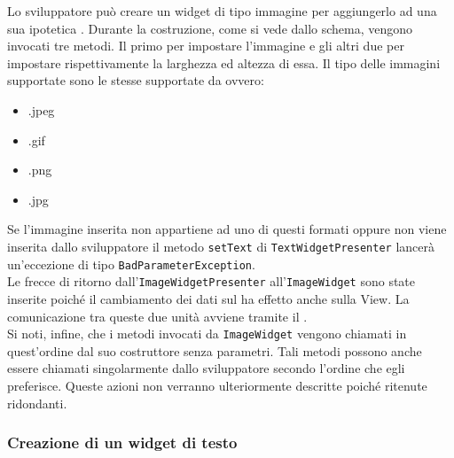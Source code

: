 Lo sviluppatore può creare un widget di tipo immagine per aggiungerlo ad una sua ipotetica . Durante la costruzione, come si vede dallo schema, vengono invocati tre metodi. Il primo per impostare l'immagine e gli altri due per impostare rispettivamente la larghezza ed altezza di essa. Il tipo delle immagini supportate sono le stesse supportate da  ovvero:
\begin{itemize}
\item .jpeg
\item .gif
\item .png
\item .jpg
\end{itemize}
Se l'immagine inserita non appartiene ad uno di questi formati oppure non viene inserita dallo sviluppatore il metodo \texttt{setText} di \texttt{TextWidgetPresenter} lancerà un'eccezione di tipo \texttt{BadParameterException}. \\
Le frecce di ritorno dall'\texttt{ImageWidgetPresenter} all'\texttt{ImageWidget} sono state inserite poiché il cambiamento dei dati sul  ha effetto anche sulla View. La comunicazione tra queste due unità avviene tramite il  . \\
Si noti, infine, che i metodi invocati da \texttt{ImageWidget} vengono chiamati in quest'ordine dal suo costruttore senza parametri. Tali metodi possono anche essere chiamati singolarmente dallo sviluppatore secondo l'ordine che egli preferisce. Queste azioni non verranno ulteriormente descritte poiché ritenute ridondanti.

\newpage

\subsubsection{Creazione di un widget di testo}

